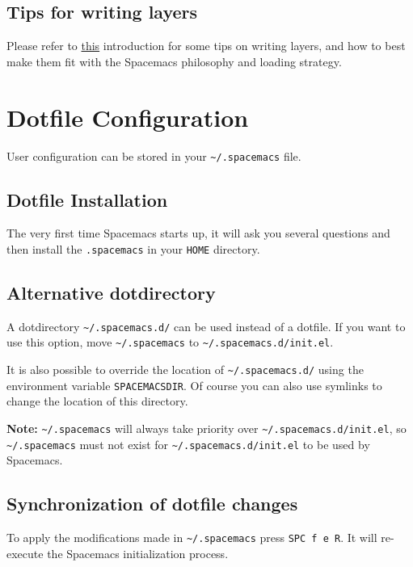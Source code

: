 \documentclass[11pt]{article}
\begin{document}
\subsection{Tips for writing layers}
\label{sec:org774f04d}
Please refer to \href{LAYERS.org}{this} introduction for some tips on writing layers, and how to
best make them fit with the Spacemacs philosophy and loading strategy.

\section{Dotfile Configuration}
\label{sec:org716eb74}
User configuration can be stored in your \texttt{\textasciitilde{}/.spacemacs} file.

\subsection{Dotfile Installation}
\label{sec:org8b54f23}
The very first time Spacemacs starts up, it will ask you several questions
and then install the \texttt{.spacemacs} in your \texttt{HOME} directory.

\subsection{Alternative dotdirectory}
\label{sec:org358209a}
A dotdirectory \texttt{\textasciitilde{}/.spacemacs.d/} can be used instead of a dotfile.
If you want to use this option, move \texttt{\textasciitilde{}/.spacemacs} to \texttt{\textasciitilde{}/.spacemacs.d/init.el}.

It is also possible to override the location of \texttt{\textasciitilde{}/.spacemacs.d/} using the
environment variable \texttt{SPACEMACSDIR}. Of course you can also use symlinks to
change the location of this directory.

\textbf{Note:} \texttt{\textasciitilde{}/.spacemacs} will always take priority over \texttt{\textasciitilde{}/.spacemacs.d/init.el},
so \texttt{\textasciitilde{}/.spacemacs} must not exist for \texttt{\textasciitilde{}/.spacemacs.d/init.el} to be used by
Spacemacs.

\subsection{Synchronization of dotfile changes}
\label{sec:org3605dd6}
To apply the modifications made in \texttt{\textasciitilde{}/.spacemacs} press \texttt{SPC f e R}. It will
re-execute the Spacemacs initialization process.
\end{document}
